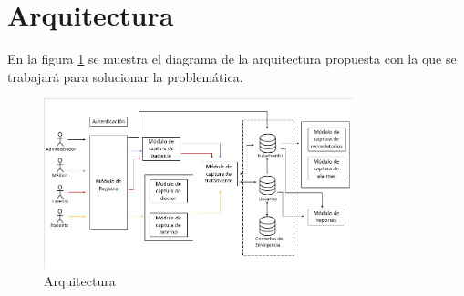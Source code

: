\section{Arquitectura}

En la figura \ref{fig:arquitectura} se muestra el diagrama de la arquitectura propuesta con la que se trabajará para solucionar la problemática.


\begin{figure}[htb]
	\centering
	\includegraphics[width=0.8\textwidth]{images/cap2/Arquitectura}
	\caption{Arquitectura} \label{fig:arquitectura}
\end{figure}


